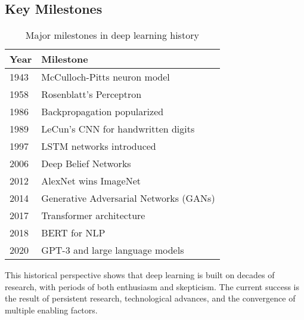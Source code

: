 \subsection{Key Milestones}

\begin{table}[h]
\centering
\small
\begin{tabular}{@{}ll@{}}
\toprule
\textbf{Year} & \textbf{Milestone} \\
\midrule
1943 & McCulloch-Pitts neuron model \\
1958 & Rosenblatt's Perceptron \\
1986 & Backpropagation popularized \\
1989 & LeCun's CNN for handwritten digits \\
1997 & LSTM networks introduced \\
2006 & Deep Belief Networks \\
2012 & AlexNet wins ImageNet \\
2014 & Generative Adversarial Networks (GANs) \\
2017 & Transformer architecture \\
2018 & BERT for NLP \\
2020 & GPT-3 and large language models \\
\bottomrule
\end{tabular}
\caption{Major milestones in deep learning history}
\label{tab:milestones}
\end{table}

This historical perspective shows that deep learning is built on decades of research, with periods of both enthusiasm and skepticism. The current success is the result of persistent research, technological advances, and the convergence of multiple enabling factors.
